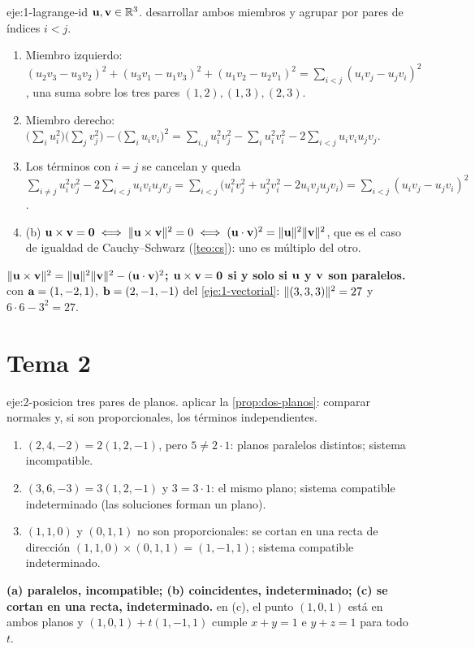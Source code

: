 \begin{solucion}{eje:1-lagrange-id}
\datos $\mathbf{u},\mathbf{v}\in\mathbb{R}^3$.
\planteamiento desarrollar ambos miembros y agrupar por pares de índices $i<j$.
\pasos
\begin{enumerate}[label=\arabic*.]
  \item Miembro izquierdo: $(u_2v_3-u_3v_2)^2+(u_3v_1-u_1v_3)^2+(u_1v_2-u_2v_1)^2=\sum_{i<j}(u_iv_j-u_jv_i)^2$, una suma sobre los tres pares $(1,2),(1,3),(2,3)$.
  \item Miembro derecho: $\bigl(\sum_iu_i^2\bigr)\bigl(\sum_jv_j^2\bigr)-\bigl(\sum_iu_iv_i\bigr)^2=\sum_{i,j}u_i^2v_j^2-\sum_iu_i^2v_i^2-2\sum_{i<j}u_iv_iu_jv_j$.
  \item Los términos con $i=j$ se cancelan y queda $\sum_{i\neq j}u_i^2v_j^2-2\sum_{i<j}u_iv_iu_jv_j=\sum_{i<j}\bigl(u_i^2v_j^2+u_j^2v_i^2-2u_iv_ju_jv_i\bigr)=\sum_{i<j}(u_iv_j-u_jv_i)^2$.
  \item (b) $\mathbf{u}\times\mathbf{v}=\mathbf{0}\iff\lVert\mathbf{u}\times\mathbf{v}\rVert^2=0\iff(\mathbf{u}\cdot\mathbf{v})^2=\lVert\mathbf{u}\rVert^2\lVert\mathbf{v}\rVert^2$, que es el caso de igualdad de Cauchy--Schwarz (\cref{teo:cs}): uno es múltiplo del otro.
\end{enumerate}
\resultado \textbf{$\lVert\mathbf{u}\times\mathbf{v}\rVert^2=\lVert\mathbf{u}\rVert^2\lVert\mathbf{v}\rVert^2-(\mathbf{u}\cdot\mathbf{v})^2$; $\mathbf{u}\times\mathbf{v}=\mathbf{0}$ si y solo si $\mathbf{u}$ y $\mathbf{v}$ son paralelos.}
\comprobacion con $\mathbf{a}=(1,-2,1)$, $\mathbf{b}=(2,-1,-1)$ del \cref{eje:1-vectorial}: $\lVert(3,3,3)\rVert^2=27$ y $6\cdot6-3^2=27$.
\end{solucion}

\section{Tema 2}

\begin{solucion}{eje:2-posicion}
\datos tres pares de planos.
\planteamiento aplicar la \cref{prop:dos-planos}: comparar normales y, si son proporcionales, los términos independientes.
\pasos
\begin{enumerate}[label=(\alph*)]
  \item $(2,4,-2)=2(1,2,-1)$, pero $5\neq2\cdot1$: planos paralelos distintos; sistema incompatible.
  \item $(3,6,-3)=3(1,2,-1)$ y $3=3\cdot1$: el mismo plano; sistema compatible indeterminado (las soluciones forman un plano).
  \item $(1,1,0)$ y $(0,1,1)$ no son proporcionales: se cortan en una recta de dirección $(1,1,0)\times(0,1,1)=(1,-1,1)$; sistema compatible indeterminado.
\end{enumerate}
\resultado \textbf{(a) paralelos, incompatible; (b) coincidentes, indeterminado; (c) se cortan en una recta, indeterminado.}
\comprobacion en (c), el punto $(1,0,1)$ está en ambos planos y $(1,0,1)+t(1,-1,1)$ cumple $x+y=1$ e $y+z=1$ para todo $t$.
\end{solucion}

